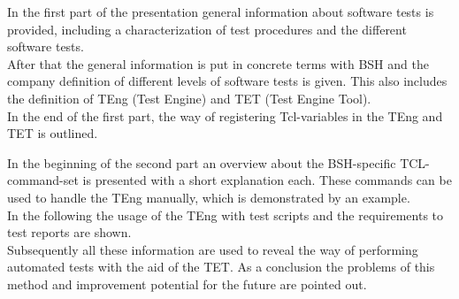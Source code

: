 In the first part of the presentation general information about software tests is provided, including a characterization of test procedures and the different software tests. \\
After that the general information is put in concrete terms with BSH and the company definition of different levels of software tests is given. This also includes the definition of TEng (Test Engine) and TET (Test Engine Tool).\\
In the end of the first part, the way of registering Tcl-variables in the TEng and TET is outlined.






In the beginning of the second part an overview about the BSH-specific TCL-command-set is presented with a short explanation each. These commands can be used to handle the TEng manually, which is demonstrated by an example.\\
In the following the usage of the TEng with test scripts and the requirements to test reports are shown.\\
Subsequently all these information are used to reveal the way of performing automated tests with the aid of the TET.
As a conclusion the problems of this method and improvement potential for the future are pointed out. 







